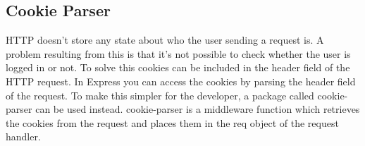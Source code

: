 \subsection{Cookie Parser}
HTTP doesn't store any state about who the user sending a request is. A problem resulting from this is that it's not possible to check whether the user is logged in or not. To solve this cookies can be included in the header field of the HTTP request. In Express you can access the cookies by parsing the header field of the request. To make this simpler for the developer, a package called cookie-parser\cite{cookie-parser:Info} can be used instead. cookie-parser is a middleware function which retrieves the cookies from the request and places them in the req object of the request handler. 